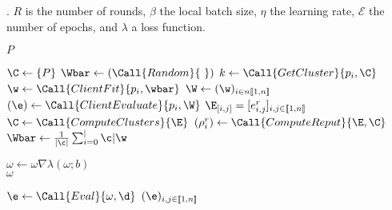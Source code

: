\begin{algorithm}[t]
\caption{
    \thecontrib.
    $R$ is the number of rounds, $\beta$ the local batch size, $\eta$ the learning rate, $\mathcal{E}$ the number of epochs, and $\lambda$ a loss function.\label{alg:xeval}}
\begin{small}
\begin{algorithmic}[1]
    \Require $P$

        \State \( \C \gets \{ P \}                  \)
        \State \( \Wbar \gets (\Call{Random}{\ })   \)
    \EndWith
    \Statex
            \State $k \gets \Call{GetCluster}{p_i, \C}$
            \State $\w \gets \Call{ClientFit}{p_i, \wbar}$
        \EndFor
        \Statex
        \State \( \W \gets (\w)_{i \in n \llbracket 1,n \rrbracket} \) 
        \Statex
            \State $(\e) \gets \Call{ClientEvaluate}{p_i, \W}$
        \EndFor
        \State \( \E_{[i,j]} = [e_{i,j}^r]_{i,j \in \llbracket 1,n \rrbracket} \)
        \Statex
        \State \( \C \gets \Call{ComputeClusters}{\E} \)     
        \ForAll{$  \c \in \C $}
            \State \( (\rho_i^r) \gets \Call{ComputeReput}{\E, \C} \)   
            \State \( \Wbar \gets \frac{1}{|\c|} \sum_{i=0}^|\c| \w \)
        \EndFor
    \EndFor

    \Statex %
     
                \State \( \omega \gets \omega \nabla \lambda(\omega;b) \) 
            \EndFor
        \EndFor
        \\
        \State \Return $\omega$
    \EndFunction

    \Statex %
     
            \State \( \e \gets \Call{Eval}{\omega, \d} \)
        \EndFor
        \State \Return $(\e)_{i,j \in [\![ 1,n ]\!]}$
    \EndFunction
\end{algorithmic}
\end{small}
\end{algorithm}

